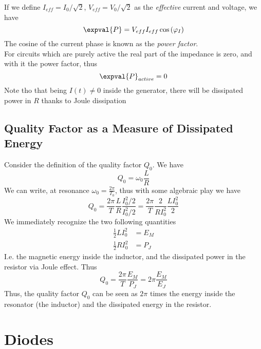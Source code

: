 \documentclass[../electromagnetism.tex]{subfiles}
\begin{document}
If we define $I_{eff}=I_0/\sqrt{2}$, $V_{eff}=V_0/\sqrt{2}$ as the \textit{effective} current and voltage, we have
\begin{equation}
	\expval{P}=V_{eff}I_{eff}\cos\left( \varphi_I \right)
	\label{eq:peff.pow}
\end{equation}
The cosine of the current phase is known as the \textit{power factor}.\\
For circuits which are purely active the real part of the impedance is zero, and with it the power factor, thus
\begin{equation*}
	\expval{P}_{active}=0
\end{equation*}
Note tho that being $I(t)\ne0$ inside the generator, there will be dissipated power in $R$ thanks to Joule dissipation
\subsection{Quality Factor as a Measure of Dissipated Energy}
Consider the definition of the quality factor $Q_0$. We have
\begin{equation*}
	Q_0=\omega_0\frac{L}{R}
\end{equation*}
We can write, at resonance $\omega_0=\frac{2\pi}{T_0}$, thus with some algebraic play we have
\begin{equation*}
	Q_0=\frac{2\pi}{T}\frac{L}{R}\frac{I_0^2/2}{I_0^2/2}=\frac{2\pi}{T}\frac{2}{RI_0^2}\frac{LI^2_0}{2}
\end{equation*}
We immediately recognize the two following quantities
\begin{equation*}
	\begin{aligned}
		\frac{1}{2}LI_0^2&= E_{M}\\
		\frac{1}{2}RI_0^2&= P_J
	\end{aligned}
\end{equation*}
I.e. the magnetic energy inside the inductor, and the dissipated power in the resistor via Joule effect. Thus
\begin{equation}
	Q_0=\frac{2\pi}{T}\frac{E_M}{P_J}=2\pi\frac{E_M}{E_J}
	\label{eq:energylossratio.qfe}
\end{equation}
Thus, the quality factor $Q_0$ can be seen as $2\pi$ times the energy inside the resonator (the inductor) and the dissipated energy in the resistor.
\section{Diodes}
\end{document}
